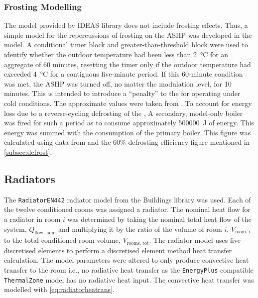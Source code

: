 \subsubsection{Frosting Modelling} \label{subsubsec:frostingmod}
The model provided by IDEAS library does not include frosting effects. Thus, a simple model for the repercussions of frosting on the \ac{ASHP} was developed in the \modelica model. A conditional timer block and greater-than-threshold block were used to identify whether the outdoor temperature had been less than \qty{2}{\celsius} for an aggregate of 60 minutes, resetting the timer only if the outdoor temperature had exceeded \qty{4}{\celsius} for a contiguous five-minute period. If this 60-minute condition was met, the \ac{ASHP} was turned off, no matter the modulation level, for 10 minutes. This is intended to introduce a ``penalty'' to the \HP for operating under cold conditions. The approximate values were taken from \citeauthor{sandstrom_frosting_2021} \cite{sandstrom_frosting_2021}. To account for energy loss due to a reverse-cycling defrosting of the \HP, A secondary, model-only boiler was fired for such a period as to consume approximately \qty{500000}{\joule} of energy. This energy was summed with the consumption of the primary boiler. This figure was calculated using data from \citeauthor{sandstrom_frosting_2021} \cite{sandstrom_frosting_2021} and the 60\% defrosting efficiency figure mentioned in \cref{subsec:defrost}. 

\subsection{Radiators} \label{subsec:rad}
The \texttt{RadiatorEN442} radiator model from the Buildings library \cite{wetter_modelica_2014} was used. Each of the twelve conditioned rooms was assigned a radiator. The nominal heat flow for a radiator in room $i$ was determined by taking the nominal total heat flow of the system, $Q_\text{flow, nom}$ and multiplying it by the ratio of the volume of room $i$, $V_{\text{room, }i}$ to the total conditioned room volume, $V_\text{rooms, tot}$. The radiator model uses five discretised elements to perform a discretised element method heat transfer calculation. The model parameters were altered to only produce convective heat transfer to the room i.e., no radiative heat transfer as the \texttt{EnergyPlus} compatible \texttt{ThermalZone} model has no radiative heat input. The convective heat transfer was modelled with \cref{eq:radiatorheatrans}.


